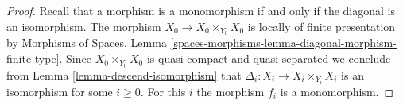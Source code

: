 \documentclass{stacks-project}
\theoremstyle{plain}
\theoremstyle{definition}
\theoremstyle{remark}
\numberwithin{equation}{subsection}
\begin{document}
\begin{proof}
Recall that a morphism is a monomorphism if and only if the diagonal is
an isomorphism. The morphism $X_0 \to X_0 \times_{Y_0} X_0$ is locally of
finite presentation by
Morphisms of Spaces, Lemma
\ref{spaces-morphisms-lemma-diagonal-morphism-finite-type}.
Since $X_0 \times_{Y_0} X_0$ is quasi-compact and quasi-separated
we conclude from
Lemma \ref{lemma-descend-isomorphism}
that $\Delta_i : X_i \to X_i \times_{Y_i} X_i$ is an isomorphism for
some $i \geq 0$. For this $i$ the morphism $f_i$ is a monomorphism.
\end{proof}
\end{document}
